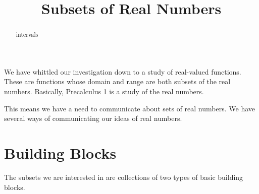 \documentclass{ximera}
\title{Subsets of Real Numbers}
\begin{document}
\begin{abstract}
intervals
\end{abstract}
\maketitle




We have whittled our investigation down to a study of real-valued functions.  These are functions whose domain and range are both subsets of the real numbers.  Basically, Precalculus 1 is a study of the real numbers.

This means we have a need to communicate about sets of real numbers.  We have several ways of communicating our ideas of real numbers.


\section{Building Blocks}

The subsets we are interested in are collections of two types of basic building blocks.
\end{document}

